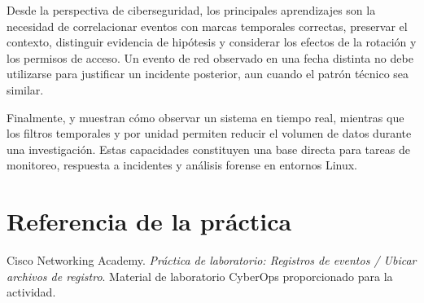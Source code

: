 \documentclass[11pt,a4paper]{article}
\newcommand{\cmd}[1]{\texttt{\detokenize{#1}}}
\begin{document}
Desde la perspectiva de ciberseguridad, los principales aprendizajes son la necesidad de correlacionar eventos con marcas temporales correctas, preservar el contexto, distinguir evidencia de hipótesis y considerar los efectos de la rotación y los permisos de acceso. Un evento de red observado en una fecha distinta no debe utilizarse para justificar un incidente posterior, aun cuando el patrón técnico sea similar.

Finalmente, \cmd{tail -f} y \cmd{journalctl -f} muestran cómo observar un sistema en tiempo real, mientras que los filtros temporales y por unidad permiten reducir el volumen de datos durante una investigación. Estas capacidades constituyen una base directa para tareas de monitoreo, respuesta a incidentes y análisis forense en entornos Linux.

\section*{Referencia de la práctica}
Cisco Networking Academy. \emph{Práctica de laboratorio: Registros de eventos / Ubicar archivos de registro}. Material de laboratorio CyberOps proporcionado para la actividad.
\end{document}
